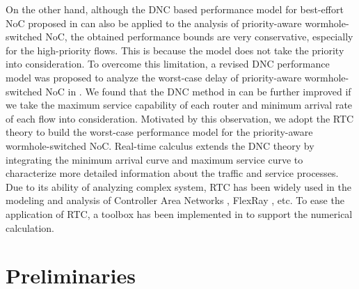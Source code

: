 \documentclass[preprint]{elsarticle}
\begin{document}
On the other hand, although the DNC based performance model for best-effort NoC proposed in \cite{qian2009analysis} can also be applied to the analysis of priority-aware wormhole-switched NoC, the obtained performance bounds are very conservative, especially for the high-priority flows. This is because the model does not take the priority into consideration. To overcome this limitation, a revised DNC performance model was proposed to analyze the worst-case delay of priority-aware wormhole-switched NoC in \cite{Qian489900}. We found that the DNC method in \cite{Qian489900} can be further improved if we take the maximum service capability of each router and minimum arrival rate of each flow into consideration. Motivated by this observation, we adopt the RTC theory \cite{1253607} to build the worst-case performance model for the priority-aware wormhole-switched NoC. Real-time calculus extends the DNC theory \cite{Boudec2001Network} by integrating the minimum arrival curve and maximum service curve to characterize more detailed information about the traffic and service processes. Due to its ability of analyzing complex system, RTC has been widely used in the modeling and analysis of Controller Area Networks \cite{4617308}, FlexRay \cite{Hagiescu:2007:PAF:1278480.1278554}, etc. To ease the application of RTC, a toolbox has been implemented in \cite{rtc} to support the numerical calculation.

\section{Preliminaries}\label{model}
\end{document}
